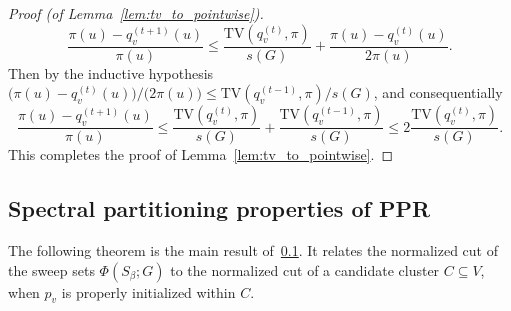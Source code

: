 \documentclass{article}
\newcommand{\1}{\mathbf{1}}
\theoremstyle{definition}
\theoremstyle{remark}
\begin{document}
\begin{proof}[Proof (of Lemma~\ref{lem:tv_to_pointwise})]
\begin{equation*}
	\frac{\pi(u) - q_v^{(t + 1)}(u)}{\pi(u)} \leq \frac{\mathrm{TV}(q_v^{(t)},\pi) }{s(G)} +\frac{\pi(u) - q_v^{(t)}(u)}{2\pi(u)}.
	\end{equation*}
	Then by the inductive hypothesis $\bigl(\pi(u) - q_v^{(t)}(u)\bigr)/\bigl(2\pi(u)\bigr) \leq \mathrm{TV}(q_v^{(t - 1)},\pi)/s(G)$, and consequentially
	\begin{equation*}
	\frac{\pi(u) - q_v^{(t + 1)}(u)}{\pi(u)} \leq \frac{\mathrm{TV}(q_v^{(t)},\pi) }{s(G)} + \frac{\mathrm{TV}(q_v^{(t - 1)},\pi) }{s(G)} \leq 2\frac{\mathrm{TV}(q_v^{(t)},\pi)}{s(G)}.
	\end{equation*}
	This completes the proof of Lemma~\ref{lem:tv_to_pointwise}.
\end{proof}

\subsection{Spectral partitioning properties of PPR}
\label{subsec:ppr_spectral_partitioning}
The following theorem is the main result of~\ref{subsec:ppr_spectral_partitioning}. It relates the normalized cut of the sweep sets $\Phi(S_{\beta};G)$ to the normalized cut of a candidate cluster $C \subseteq V$, when $p_v$ is properly initialized within $C$.
\end{document}
